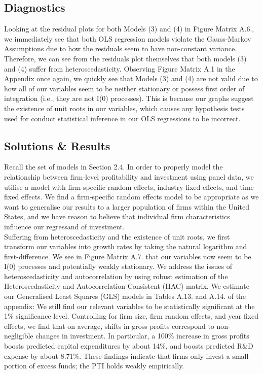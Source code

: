 \subsection{Diagnostics}

Looking at the residual plots for both Models (3) and (4) in Figure Matrix A.6., we immediately see that both OLS regression models violate the Gauss-Markov Assumptions due to how the residuals seem to have non-constant variance. Therefore, we can see from the residuals plot themselves that both models (3) and (4) suffer from heteroscedasticity. Observing Figure Matrix A.1 in the Appendix once again, we quickly see that Models (3) and (4) are not valid due to how all of our variables seem to be neither stationary or possess first order of integration (i.e., they are not I(0) processes). This is because our graphs suggest the existence of unit roots in our variables, which causes any hypothesis tests used for conduct statistical inference in our OLS regressions to be incorrect.

\subsection{Solutions \& Results}

Recall the set of models in Section 2.4. In order to properly model the relationship between firm-level profitability and investment using panel data, we utilise a model with firm-specific random effects, industry fixed effects, and time fixed effects. We find a firm-specific random effects model to be appropriate as we want to generalise our results to a larger population of firms within the United States, and we have reason to believe that individual firm characteristics influence our regressand of investment. \\

Suffering from heteroscedasticity and the existence of unit roots, we first transform our variables into growth rates by taking the natural logarithm and first-difference. We see in Figure Matrix A.7. that our variables now seem to be I(0) processes and potentially weakly stationary. We address the issues of heteroscedasticity and autocorrelation by using robust estimation of the Heteroscedasticity and Autocorrelation Consistent (HAC) matrix. We estimate our Generalised Least Squares (GLS) models in Tables A.13. and A.14. of the appendix: We still find our relevant variables to be statistically significant at the 1\% significance level. Controlling for firm size, firm random effects, and year fixed effects, we find that on average, shifts in gross profits correspond to non-negligible changes in investment. In particular, a 100\% increase in gross profits boosts predicted capital expenditures by about 14\%, and boosts predicted R\&D expense by about 8.71\%. These findings indicate that firms only invest a small portion of excess funds; the PTI holds weakly empirically.

